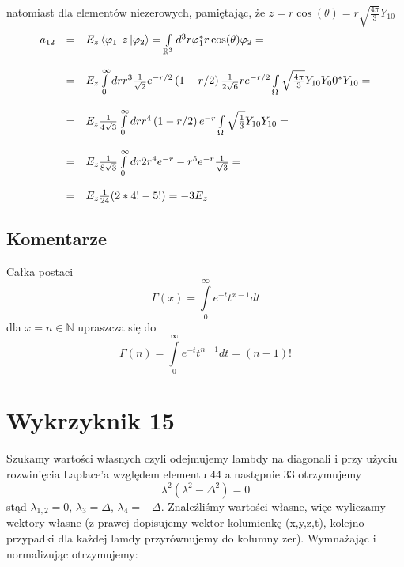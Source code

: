 \documentclass[a4paper,12pt]{article}
\begin{document}
	natomiast dla elementów niezerowych, pamiętając, że $z = r\cos(\theta) = r\sqrt{\frac{4\pi}{3}}Y_{10}$
		$$
		\begin{array}{lll}
			a_{12} &=& E_z \bra{\varphi_1}z\ket{\varphi_2} = \int\limits_{\mathbb{R}^3}d^3r\varphi_1^*r\cos(\theta)\varphi_2 = \\\\
				   &=& E_z \int\limits_0^\infty dr r^3 \frac{1}{\sqrt{2}}e^{-r/2}\left(1-r/2\right)
				   \frac{1}{2\sqrt{6}}re^{-r/2}\int\limits_{\Omega}\sqrt{\frac{4\pi}{3}}Y_{10}Y_00^*Y_{10} = \\\\
				   &=& E_z \frac{1}{4\sqrt{3}}\int\limits_0^\infty dr r^4\left(1-r/2\right)e^{-r} \int\limits_{\Omega}\sqrt{\frac{1}{3}}Y_{10}Y_{10} =\\\\
				   &=& E_z \frac{1}{8\sqrt{3}}\int\limits_0^\infty dr 2r^4e^{-r}-r^5e^{-r} \frac{1}{\sqrt{3}} = \\\\
				   &=& E_z \frac{1}{24}(2*4!-5!) = -3 E_z
		\end{array}
		$$
		
\subsection{Komentarze}
	Całka postaci 
	$$
		\Gamma(x) = \int\limits_0^\infty e^{-t}t^{x-1}dt 
	$$
	dla $x=n\in\mathbb{N}$ upraszcza się do
	$$
		\Gamma(n) = \int\limits_0^\infty e^{-t}t^{n-1}dt =(n-1)!
	$$

\section{Wykrzyknik 15}
Szukamy wartości własnych czyli odejmujemy lambdy na diagonali i przy użyciu
rozwinięcia Laplace'a względem elementu 44 a następnie 33 otrzymujemy
\begin{equation*}
  \lambda^2 \left( \lambda^2 - \Delta^2 \right) = 0
\end{equation*}
stąd $\lambda_{1,2} = 0$, $\lambda_3 = \Delta$, $\lambda_4 = -\Delta$.
Znaleźliśmy wartości własne, więc wyliczamy wektory własne (z prawej dopisujemy
wektor-kolumienkę (x,y,z,t), kolejno przypadki dla każdej lamdy przyrównujemy do
kolumny zer). Wymnażając i normalizując otrzymujemy:
\end{document}
